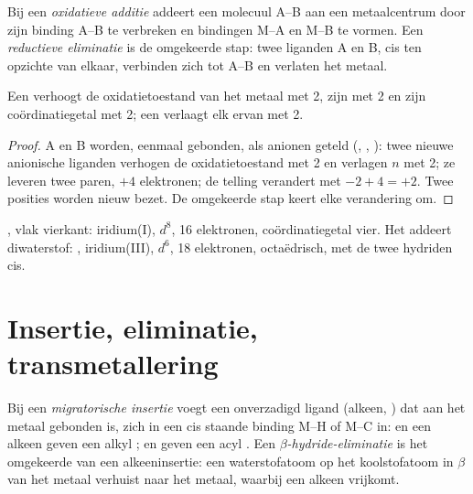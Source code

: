 \begin{definition}\label{def:b2:catalytic-cycles:oxidative-addition}
Bij een \emph{oxidatieve additie} addeert een molecuul A--B aan een
metaalcentrum door zijn binding A--B te verbreken en bindingen M--A en M--B te vormen. Een
\emph{reductieve eliminatie} is de omgekeerde stap: twee
liganden A en B, cis ten opzichte van elkaar, verbinden zich tot A--B en verlaten het metaal.
\end{definition}

\begin{proposition}\label{prop:b2:catalytic-cycles:oa}
Een  verhoogt de oxidatietoestand van het metaal met 2, zijn 
met 2 en zijn coördinatiegetal met 2; een  verlaagt elk ervan met 2.
\end{proposition}

\begin{proof}
A en B worden, eenmaal gebonden, als anionen geteld (, , ): twee nieuwe anionische
liganden verhogen de oxidatietoestand met 2 en verlagen $n$ met 2; ze leveren twee paren, $+4$
elektronen; de telling verandert met $-2 + 4 = +2$. Twee posities worden nieuw bezet. De
omgekeerde stap keert elke verandering om.
\end{proof}

\begin{example}\label{ex:b2:catalytic-cycles:vaska}
, vlak vierkant: iridium(I), $d^8$, 16 elektronen, coördinatiegetal vier.
Het addeert diwaterstof: , iridium(III), $d^6$, 18 elektronen, octaëdrisch,
met de twee hydriden cis.
\end{example}

\section{Insertie, eliminatie, transmetallering}

\begin{definition}\label{def:b2:catalytic-cycles:insertion}
Bij een \emph{migratorische insertie} voegt een onverzadigd ligand
(alkeen, ) dat aan het metaal gebonden is, zich in een cis staande binding M--H of M--C in:  en een
alkeen geven een alkyl ;  en  geven een acyl .
Een \emph{$\beta$-hydride-eliminatie}
is het omgekeerde van een alkeeninsertie: een waterstofatoom op het koolstofatoom in $\beta$ van het
metaal verhuist naar het metaal, waarbij een alkeen vrijkomt.
\end{definition}


